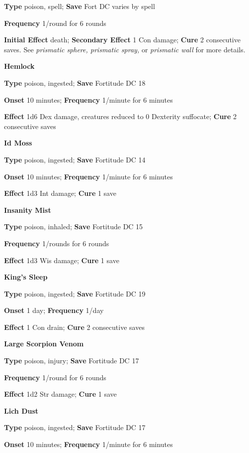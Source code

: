 \textbf{Type} poison, spell; \textbf{Save} Fort DC varies by spell
				
\textbf{Frequency} 1/round for 6 rounds
				
\textbf{Initial Effect }death;\textbf{ Secondary Effect }1 Con damage; \textbf{Cure} 2 consecutive saves. See \textit{prismatic sphere, prismatic spray, }or \textit{prismatic wall} for more details.
				
\textbf{Hemlock}
				
\textbf{Type} poison, ingested; \textbf{Save} Fortitude DC 18
				
\textbf{Onset }10 minutes; \textbf{Frequency} 1/minute for 6 minutes
				
\textbf{Effect }1d6 Dex damage, creatures reduced to 0 Dexterity suffocate;\textbf{ Cure} 2 consecutive saves
				
\textbf{Id Moss }
				
\textbf{Type} poison, ingested; \textbf{Save} Fortitude DC 14 
				
\textbf{Onset }10 minutes; \textbf{Frequency} 1/minute for 6 minutes
				
\textbf{Effect }1d3 Int damage;\textbf{ Cure} 1 save
				
\textbf{Insanity Mist }
				
\textbf{Type} poison, inhaled; \textbf{Save} Fortitude DC 15 
				
\textbf{Frequency} 1/rounds for 6 rounds
				
\textbf{Effect }1d3 Wis damage;\textbf{ Cure} 1 save
				
\textbf{King's Sleep }
				
\textbf{Type} poison, ingested; \textbf{Save} Fortitude DC 19 
				
\textbf{Onset }1 day; \textbf{Frequency} 1/day
				
\textbf{Effect }1 Con drain;\textbf{ Cure} 2 consecutive saves
				
\textbf{Large Scorpion Venom }
				
\textbf{Type} poison, injury; \textbf{Save} Fortitude DC 17 
				
\textbf{Frequency} 1/round for 6 rounds
				
\textbf{Effect }1d2 Str damage;\textbf{ Cure} 1 save
				
\textbf{Lich Dust }
				
\textbf{Type} poison, ingested; \textbf{Save} Fortitude DC 17 
				
\textbf{Onset }10 minutes; \textbf{Frequency} 1/minute for 6 minutes
				
